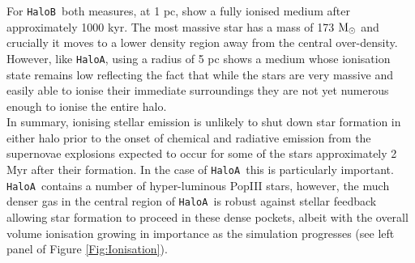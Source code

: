 \documentclass[graphics, twocolumn, usenatbib]{mn2e}
\newcommand{\msolar} {$\rm{M_{\odot}}~$}
\newcommand{\ha} {\texttt{HaloA~}}
\newcommand{\hb} {\texttt{HaloB~}}
\newcommand{\hac} {\texttt{HaloA}}
\begin{document}
\indent For \hb both measures, at 1 pc,  show a fully ionised medium
after approximately 1000 kyr. The most massive star has a mass of 173 \msolar and crucially
it moves to a lower
density region away from the central over-density. However, like \hac, using a radius of 5 pc shows
a medium whose ionisation state remains low reflecting the fact that while the stars are very
massive and easily able to ionise their immediate surroundings they are not yet numerous enough
to ionise the entire halo. \\
\indent In summary, ionising stellar emission is unlikely to shut down star formation in
either halo prior to the onset of chemical and radiative emission from the supernovae
explosions expected to occur for some of the stars \citep[e.g. see][]{Heger_2003}
approximately 2 Myr  after their formation. In
the case of \ha this is particularly important. \ha contains a number of hyper-luminous PopIII stars,
however, the much denser gas in the central region of \ha is robust against stellar feedback
allowing star formation to proceed in these dense pockets, 
albeit with the overall volume ionisation growing in importance as the simulation progresses
(see left panel of Figure \ref{Fig:Ionisation}).
\end{document}
